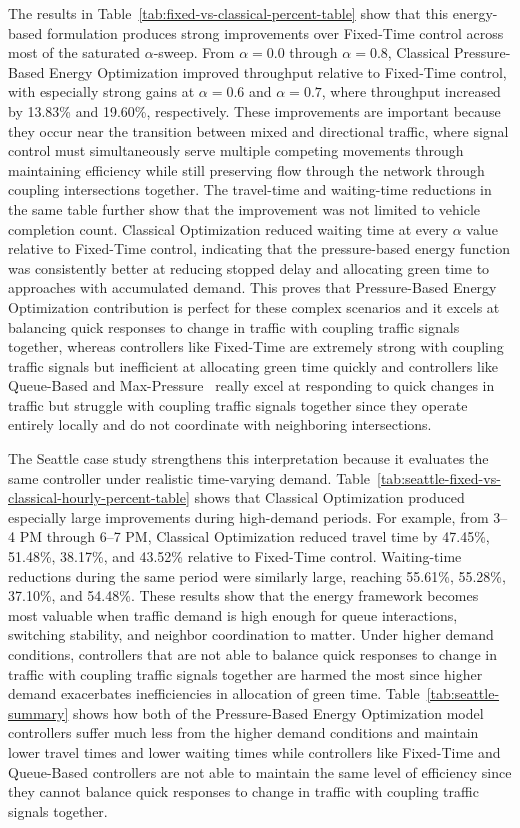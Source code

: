 \documentclass[12pt]{article}
\begin{document}
The results in Table~\ref{tab:fixed-vs-classical-percent-table} show that this energy-based formulation produces strong improvements over Fixed-Time control across most of the saturated $\alpha$-sweep. From $\alpha=0.0$ through $\alpha=0.8$, Classical Pressure-Based Energy Optimization improved throughput relative to Fixed-Time control, with especially strong gains at $\alpha=0.6$ and $\alpha=0.7$, where throughput increased by 13.83\% and 19.60\%, respectively. These improvements are important because they occur near the transition between mixed and directional traffic, where signal control must simultaneously serve multiple competing movements through maintaining efficiency while still preserving flow through the network through coupling intersections together. The travel-time and waiting-time reductions in the same table further show that the improvement was not limited to vehicle completion count. Classical Optimization reduced waiting time at every $\alpha$ value relative to Fixed-Time control, indicating that the pressure-based energy function was consistently better at reducing stopped delay and allocating green time to approaches with accumulated demand. This proves that Pressure-Based Energy Optimization contribution is perfect for these complex scenarios and it excels at balancing quick responses to change in traffic with coupling traffic signals together, whereas controllers like Fixed-Time are extremely strong with coupling traffic signals but inefficient at allocating green time quickly and controllers like Queue-Based and Max-Pressure~\cite{varaiya2013} really excel at responding to quick changes in traffic but struggle with coupling traffic signals together since they operate entirely locally and do not coordinate with neighboring intersections. 

The Seattle case study strengthens this interpretation because it evaluates the same controller under realistic time-varying demand. Table~\ref{tab:seattle-fixed-vs-classical-hourly-percent-table} shows that Classical Optimization produced especially large improvements during high-demand periods. For example, from 3--4 PM through 6--7 PM, Classical Optimization reduced travel time by 47.45\%, 51.48\%, 38.17\%, and 43.52\% relative to Fixed-Time control. Waiting-time reductions during the same period were similarly large, reaching 55.61\%, 55.28\%, 37.10\%, and 54.48\%. These results show that the energy framework becomes most valuable when traffic demand is high enough for queue interactions, switching stability, and neighbor coordination to matter. Under higher demand conditions, controllers that are not able to balance quick responses to change in traffic with coupling traffic signals together are harmed the most since higher demand exacerbates inefficiencies in allocation of green time. Table~\ref{tab:seattle-summary}  shows how both of the Pressure-Based Energy Optimization model controllers suffer much less from the higher demand conditions and maintain lower travel times and lower waiting times while controllers like Fixed-Time and Queue-Based controllers are not able to maintain the same level of efficiency since they cannot balance quick responses to change in traffic with coupling traffic signals together.
\end{document}
